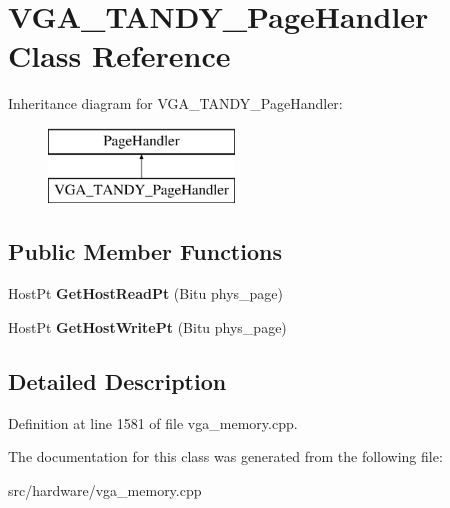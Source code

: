 \hypertarget{classVGA__TANDY__PageHandler}{\section{V\-G\-A\-\_\-\-T\-A\-N\-D\-Y\-\_\-\-Page\-Handler Class Reference}
\label{classVGA__TANDY__PageHandler}
}
Inheritance diagram for V\-G\-A\-\_\-\-T\-A\-N\-D\-Y\-\_\-\-Page\-Handler\-:\begin{figure}[H]
\begin{center}
\leavevmode
\includegraphics[height=2.000000cm]{classVGA__TANDY__PageHandler}
\end{center}
\end{figure}
\subsection*{Public Member Functions}
\begin{DoxyCompactItemize}
\item 
\hypertarget{classVGA__TANDY__PageHandler_a8c39c6f07a7c47fa66839f49dbac7585}{Host\-Pt {\bfseries Get\-Host\-Read\-Pt} (Bitu phys\-\_\-page)}\label{classVGA__TANDY__PageHandler_a8c39c6f07a7c47fa66839f49dbac7585}

\item 
\hypertarget{classVGA__TANDY__PageHandler_aa7f32d214017a07179bc6b8187028e69}{Host\-Pt {\bfseries Get\-Host\-Write\-Pt} (Bitu phys\-\_\-page)}\label{classVGA__TANDY__PageHandler_aa7f32d214017a07179bc6b8187028e69}

\end{DoxyCompactItemize}


\subsection{Detailed Description}


Definition at line 1581 of file vga\-\_\-memory.\-cpp.



The documentation for this class was generated from the following file\-:\begin{DoxyCompactItemize}
\item 
src/hardware/vga\-\_\-memory.\-cpp\end{DoxyCompactItemize}
